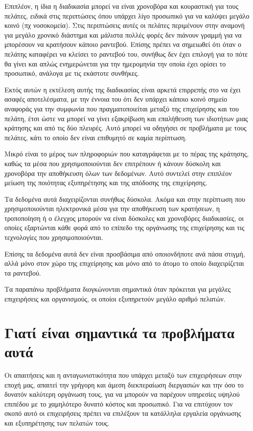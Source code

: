 Επιπλέον, η ίδια η διαδικασία μπορεί να είναι χρονοβόρα και κουραστική για τους πελάτες, ειδικά στις περιπτώσεις όπου υπάρχει λίγο προσωπικό για να καλύψει μεγάλο κοινό (πχ νοσοκομεία). Στις περιπτώσεις αυτές οι πελάτες περιμένουν στην αναμονή για μεγάλο χρονικό διάστημα και μάλιστα πολλές φορές δεν πιάνουν γραμμή για να μπορέσουν να κρατήσουν κάποιο ραντεβού. Επίσης πρέπει να σημειωθεί ότι όταν ο πελάτης καταφέρει να κλείσει το ραντεβού του, συνήθως δεν έχει επιλογή για το πότε θα γίνει και απλώς ενημερώνεται για την ημερομηνία την οποία έχει ορίσει το προσωπικό, ανάλογα με τις εκάστοτε συνθήκες.  

Εκτός αυτών η εκτέλεση αυτής της διαδικασίας είναι αρκετά επιρρεπής στο να έχει ασαφές αποτελέσματα, με την έννοια του ότι δεν υπάρχει κάποιο κοινό σημείο αναφοράς για την συμφωνία που πραγματοποιείται μεταξύ της επιχείρησης και του πελάτη, έτσι ώστε να μπορεί να γίνει εξακρίβωση και επαλήθευση των ιδιοτήτων μιας κράτησης και από τις δύο πλευρές. Αυτό μπορεί να οδηγήσει σε προβλήματα με τους πελάτες, κάτι το οποίο δεν είναι επιθυμητό σε καμία περίπτωση.

Μικρό είναι το μέρος των πληροφοριών που καταγράφεται με το πέρας της κράτησης, καθώς τα μέσα που χρησιμοποιούνται δεν επιτρέπουν ή κάνουν δύσκολη και χρονοβόρα την αποθήκευση όλων των δεδομένων. Αυτό συντελεί στην επιπλέον μείωση της ποιότητας εξυπηρέτησης και της απόδοσης της επιχείρησης.

Τα δεδομένα αυτά διαχειρίζονται συνήθως δύσκολα. Ακόμα και στην περίπτωση που χρησιμοποιούνται ηλεκτρονικά μέσα για την αποθήκευση των κρατήσεων, η τροποποίηση ή ο έλεγχος μπορούν να είναι δύσκολες και χρονοβόρες διαδικασίες, οι οποίες εξαρτώνται κάθε φορά από το επίπεδο της οργάνωσης της επιχείρησης και τις τεχνολογίες που χρησιμοποιούνται. 

Επίσης τα δεδομένα αυτά δεν είναι προσβάσιμα από οποιονδήποτε ανά πάσα στιγμή, αλλά μόνο στον χώρο της επιχείρησης και μόνο από το άτομο το οποίο διαχειρίζεται τα ραντεβού. 

Τα παραπάνω προβλήματα διογκώνονται σημαντικά όταν πρόκειται για μεγάλες επιχειρήσεις και οργανισμούς, οι οποίοι εξυπηρετούν μεγάλο αριθμό πελατών.

\section {Γιατί είναι σημαντικά τα προβλήματα αυτά}
Οι απαιτήσεις και η ανταγωνιστικότητα που υπάρχει μεταξύ των επιχειρήσεων στην εποχή μας, απαιτεί την γρήγορη και άμεση διεκπεραίωση διεργασιών και την όσο το δυνατόν καλύτερη οργάνωση τους, για να μπορούν να παρέχουν υπηρεσίες υψηλού επιπέδου με το χαμηλότερο δυνατό κόστος και προσωπικό. Για να επιτύχουν τον σκοπό αυτό οι επιχειρήσεις πρέπει να επιλέξουν τα κατάλληλα εργαλεία οργάνωσης και εξυπηρέτησης των πελατών τους.

